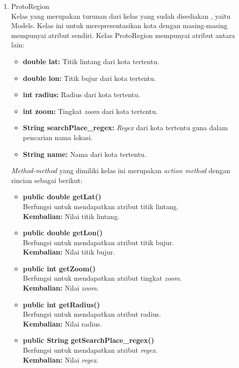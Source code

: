 \begin{enumerate}
	\item ProtoRegion\\
	Kelas yang merupakan turunan dari kelas yang sudah disediakan \play, yaitu Models. Kelas ini untuk merepresentasikan kota dengan masing-masing mempunyai atribut sendiri. Kelas ProtoRegion mempunyai atribut antara lain:
	\begin{itemize}
		\item \textbf{double lat:} Titik lintang dari kota tertentu.
		\item \textbf{double lon:} Titik bujur dari kota tertentu.
		\item \textbf{int radius:}  Radius dari kota tertentu.
		\item \textbf{int zoom:}  Tingkat \textit{zoom} dari kota tertentu.
		\item \textbf{String searchPlace\_regex:}  \textit{Regex} dari kota tertentu guna dalam pencarian nama lokasi.
		\item \textbf{String name:}  Nama dari kota tertentu.
	\end{itemize}
	
	\textit{Method-method} yang dimiliki kelas ini merupakan \textit{action method} dengan rincian sebagai berikut:
	\begin{itemize}
		\item \textbf{public double getLat()}\\
		Berfungsi untuk mendapatkan atribut titik lintang.\\
		\textbf{Kembalian:}  Nilai titik lintang.
		
		\item \textbf{public double getLon()}\\
		Berfungsi untuk mendapatkan atribut titik bujur.\\
		\textbf{Kembalian:}  Nilai titik bujur.
		
		\item \textbf{public int getZoom()}\\
		Berfungsi untuk mendapatkan atribut tingkat \textit{zoom}.\\
		\textbf{Kembalian:}  Nilai \textit{zoom}.
		
		\item \textbf{public int getRadius()}\\
		Berfungsi untuk mendapatkan atribut radius.\\
		\textbf{Kembalian:}  Nilai radius.
		
		\item \textbf{public String getSearchPlace\_regex()}\\
		Berfungsi untuk mendapatkan atribut \textit{regex}.\\
		\textbf{Kembalian:}  Nilai \textit{regex}.
		

\end{itemize}
\end{enumerate}
